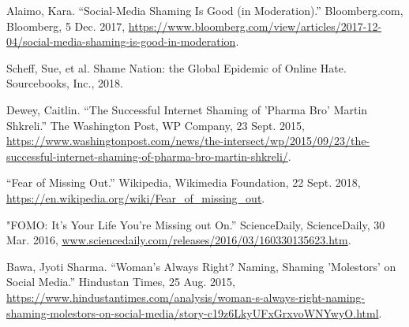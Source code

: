 \documentclass[a4paper, 11pt]{article}
\begin{document}
\begin{thebibliography}{X}
  Alaimo, Kara. “Social-Media Shaming Is Good (in Moderation).” Bloomberg.com, Bloomberg, 5 Dec. 2017, \href{https://www.bloomberg.com/view/articles/2017-12-04/social-media-shaming-is-good-in-moderation}{https://www.bloomberg.com/view/articles/2017-12-04/social-media-shaming-is-good-in-moderation}.

  Scheff, Sue, et al. Shame Nation: the Global Epidemic of Online Hate. Sourcebooks, Inc., 2018.

  Dewey, Caitlin. “The Successful Internet Shaming of 'Pharma Bro' Martin Shkreli.” The Washington Post, WP Company, 23 Sept. 2015, \href{https://www.washingtonpost.com/news/the-intersect/wp/2015/09/23/the-successful-internet-shaming-of-pharma-bro-martin-shkreli/}{https://www.washingtonpost.com/news/the-intersect/wp/2015/09/23/the-successful-internet-shaming-of-pharma-bro-martin-shkreli/}.

  “Fear of Missing Out.” Wikipedia, Wikimedia Foundation, 22 Sept. 2018, \href{https://en.wikipedia.org/wiki/Fear\_of\_missing\_out}{https://en.wikipedia.org/wiki/Fear\_of\_missing\_out}.

  "FOMO: It's Your Life You're Missing out On.” ScienceDaily, ScienceDaily, 30 Mar. 2016, \href{www.sciencedaily.com/releases/2016/03/160330135623.htm}{www.sciencedaily.com/releases/2016/03/160330135623.htm}.

  Bawa, Jyoti Sharma. “Woman's Always Right? Naming, Shaming 'Molestors' on Social Media.” Hindustan Times, 25 Aug. 2015, \href{https://www.hindustantimes.com/analysis/woman-s-always-right-naming-shaming-molestors-on-social-media/story-c19z6LkyUFxGrxvoWNYwyO.html}{https://www.hindustantimes.com/analysis/woman-s-always-right-naming-shaming-molestors-on-social-media/story-c19z6LkyUFxGrxvoWNYwyO.html}.

\end{thebibliography}
\end{document}

